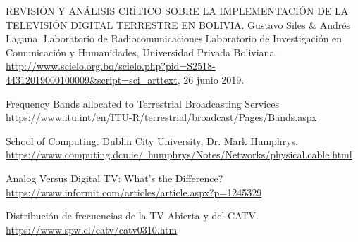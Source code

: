 \begin{thebibliography}{9}
REVISIÓN Y ANÁLISIS CRÍTICO SOBRE LA IMPLEMENTACIÓN DE LA TELEVISIÓN DIGITAL TERRESTRE  EN BOLIVIA. Gustavo Siles \& Andrés Laguna, Laboratorio de Radiocomunicaciones,Laboratorio de Investigación en Comunicación y Humanidades, Universidad Privada Boliviana. \href{http://www.scielo.org.bo/scielo.php?pid=S2518-44312019000100009{\&}script=sci{\_}arttext}{http://www.scielo.org.bo/scielo.php?pid=S2518-44312019000100009{\&}script=sci{\_}arttext}, 26 junio 2019.

Frequency Bands allocated to Terrestrial Broadcasting Services \href{https://www.itu.int/en/ITU-R/terrestrial/broadcast/Pages/Bands.aspx}{https://www.itu.int/en/ITU-R/terrestrial/broadcast/Pages/Bands.aspx}

School of Computing. Dublin City University, Dr. Mark Humphrys. \href{https://www.computing.dcu.ie/~humphrys/Notes/Networks/physical.cable.html}{https://www.computing.dcu.ie/~humphrys/Notes/Networks/physical.cable.html}


Analog Versus Digital TV: What's the Difference? \href{https://www.informit.com/articles/article.aspx?p=1245329}{https://www.informit.com/articles/article.aspx?p=1245329}

Distribución de frecuencias de la TV Abierta y del CATV. \href{https://www.spw.cl/catv/catv0310.htm}{https://www.spw.cl/catv/catv0310.htm}

\end{thebibliography}

